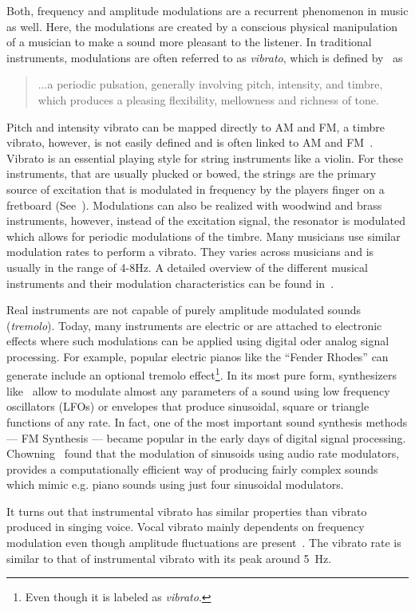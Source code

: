 Both, frequency and amplitude modulations are a recurrent phenomenon in music as well.
Here, the modulations are created by a conscious physical manipulation of a musician to make a sound more pleasant to the listener.
In traditional instruments, modulations are often referred to as \emph{vibrato}, which is defined by~\cite{seashore31} as

\begin{quote}
...a periodic pulsation, generally involving pitch, intensity, and timbre, which produces a pleasing flexibility, mellowness and richness of tone.
\end{quote}

Pitch and intensity vibrato can be mapped directly to AM and FM, a timbre vibrato, however, is not easily defined and is often linked to AM and FM~\cite{desain99}.
Vibrato is an essential playing style for string instruments like a violin. 
For these instruments, that are usually plucked or bowed, the strings are the primary source of excitation that is modulated in frequency by the players finger on a fretboard (See~\cite{macleod06}).
Modulations can also be realized with woodwind and brass instruments, however, instead of the excitation signal, the resonator is modulated which allows for periodic modulations of the timbre.
Many musicians use similar modulation rates to perform a vibrato.
They varies across musicians and is usually in the range of 4-8\si{\hertz}.
A detailed overview of the different musical instruments and their modulation characteristics can be found in~\cite{fletcher01}.
\par
Real instruments are not capable of purely amplitude modulated sounds (\emph{tremolo}). 
Today, many instruments are electric or are attached to electronic effects where such modulations can be applied using digital oder analog signal processing.
For example, popular electric pianos like the ``Fender Rhodes'' can generate include an optional tremolo effect\footnote{Even though it is labeled as \emph{vibrato}.}.
In its most pure form, synthesizers like~\cite{pinch09, buchla05} allow to modulate almost any parameters of a sound using low frequency oscillators (LFOs) or envelopes that produce sinusoidal, square or triangle functions of any rate.
In fact, one of the most important sound synthesis methods --- FM Synthesis --- became popular in the early days of digital signal processing. 
Chowning~\cite{chowning73} found that the modulation of sinusoids using audio rate modulators, provides a computationally efficient way of producing fairly complex sounds which mimic e.g. piano sounds using just four sinusoidal modulators.
\par
It turns out that instrumental vibrato has similar properties than vibrato produced in singing voice.
Vocal vibrato mainly dependents on frequency modulation even though amplitude fluctuations are present~\cite{sundberg94}. 
The vibrato rate is similar to that of instrumental vibrato with its peak around 5~\si{\hertz}.

